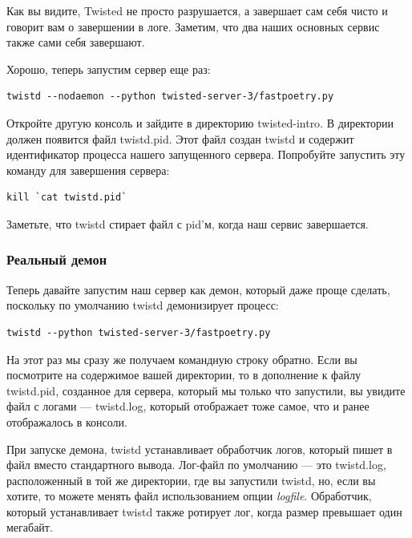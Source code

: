 Как вы видите, Twisted не просто разрушается, а завершает сам 
себя чисто и говорит вам о завершении в логе. Заметим, что два 
наших основных сервис также сами себя завершают.


Хорошо, теперь запустим сервер еще раз:

\begin{scriptsize}\begin{verbatim}
twistd --nodaemon --python twisted-server-3/fastpoetry.py
\end{verbatim}\end{scriptsize}


Откройте другую консоль и зайдите в директорию twisted-intro. 
В директории должен появится файл twistd.pid. Этот файл создан 
twistd и содержит идентификатор процесса нашего запущенного 
сервера. Попробуйте запустить эту команду для завершения сервера: 

\begin{scriptsize}\begin{verbatim}
kill `cat twistd.pid`
\end{verbatim}\end{scriptsize}

Заметьте, что twistd стирает файл с pid'м, когда наш сервис завершается.


\subsubsection{Реальный демон}


Теперь давайте запустим наш сервер как 
демон, который даже проще сделать, поскольку 
по умолчанию twistd демонизирует процесс:

\begin{scriptsize}\begin{verbatim}
twistd --python twisted-server-3/fastpoetry.py
\end{verbatim}\end{scriptsize}


На этот раз мы сразу же получаем командную строку обратно. 
Если вы посмотрите на содержимое вашей директории, 
то в дополнение к файлу twistd.pid, созданное для сервера, 
который мы только что запустили, вы увидите файл с 
логами --- twistd.log, который отображает тоже самое, что и 
ранее отображалось в консоли.


При запуске демона, twistd устанавливает обработчик логов, 
который пишет в файл вместо стандартного вывода. Лог-файл 
по умолчанию --- это twistd.log, расположенный в той же 
директории, где вы запустили twistd, но, если вы хотите, то 
можете менять файл использованием опции \textit{logfile}. 
Обработчик, который устанавливает twistd также ротирует лог, 
когда размер превышает один мегабайт.


